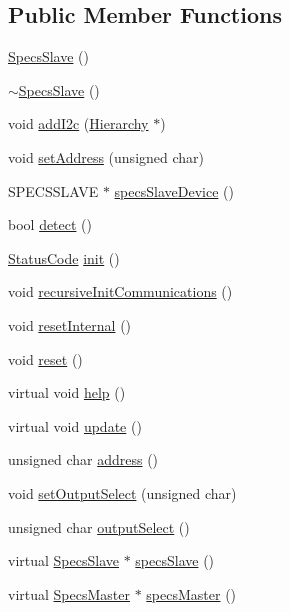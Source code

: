 \subsection*{Public Member Functions}
\begin{DoxyCompactItemize}
\item 
\hyperlink{classSpecsSlave_a4170ce73e2fd5ce2b8a7b8ef55226556}{SpecsSlave} ()
\item 
\hyperlink{classSpecsSlave_a8194c1d1a4e7a0e250e5b7dd72b0b437}{$\sim$SpecsSlave} ()
\item 
void \hyperlink{classSpecsSlave_af462b4d6e716ceb4bd454ad835938737}{addI2c} (\hyperlink{classHierarchy}{Hierarchy} $\ast$)
\item 
void \hyperlink{classSpecsSlave_a1e5917c1f323cd7b4aabe4940c6baf12}{setAddress} (unsigned char)
\item 
SPECSSLAVE $\ast$ \hyperlink{classSpecsSlave_a44970aca61b6fdcd6d6d90e6601093f3}{specsSlaveDevice} ()
\item 
bool \hyperlink{classSpecsSlave_aa1411ca849bda04215518b08535185e2}{detect} ()
\item 
\hyperlink{classStatusCode}{StatusCode} \hyperlink{classSpecsSlave_ab34b5117373a334027d3a5cf33287bb6}{init} ()
\item 
void \hyperlink{classSpecsSlave_a347b94c2ba660ccde6927fe72590a1bc}{recursiveInitCommunications} ()
\item 
void \hyperlink{classSpecsSlave_aa4f2493eabe522bb6651abcd67a6a690}{resetInternal} ()
\item 
void \hyperlink{classSpecsSlave_a6c69baff5941cabed2947f547041bbeb}{reset} ()
\item 
virtual void \hyperlink{classSpecsInterface_a24bf2b5e2da6c675ba5de3b226481a73}{help} ()
\item 
virtual void \hyperlink{classSpecsInterface_af17ca5c8d48bea81f84e503b2994f5da}{update} ()
\item 
unsigned char \hyperlink{classSpecsInterface_a0fa039a15b842a5ba783ce825b9915d8}{address} ()
\item 
void \hyperlink{classSpecsInterface_a1907d360f2bda367cfb1d39e379c6493}{setOutputSelect} (unsigned char)
\item 
unsigned char \hyperlink{classSpecsInterface_ab291ed03f4c2f0143e14c26ad5f648dd}{outputSelect} ()
\item 
virtual \hyperlink{classSpecsSlave}{SpecsSlave} $\ast$ \hyperlink{classSpecsInterface_a13cf39bddfa8ba21d6e6aa78e78f0e4f}{specsSlave} ()
\item 
virtual \hyperlink{classSpecsMaster}{SpecsMaster} $\ast$ \hyperlink{classSpecsInterface_a3d497c965fb6ec06b49a54b7901a22b2}{specsMaster} ()

\end{DoxyCompactItemize}
